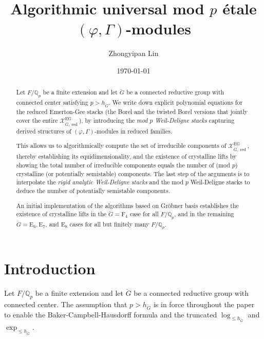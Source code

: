 \documentclass[11pt]{amsart}
\theoremstyle{definition}
\newcommand{\Q}{\mathbb{Q}}
\newcommand{\cX}{\mathcal{X}}
\newcommand{\bG}{\breve{G}}
\DeclareMathOperator{\EG}{EG}
\DeclareMathOperator{\red}{red}
\begin{document}
\title{Algorithmic universal mod $p$ \'etale $(\varphi, \Gamma)$-modules}

\author{Zhongyipan Lin}
\date{\today}





\begin{abstract}
Let $F/\Q_p$ be a finite extension and
let $\bG$ be a connected reductive group
with connected center
satisfying $p>h_{\bG}$.
We write down explicit polynomial equations
for the reduced Emerton-Gee stacks
(the Borel and the twisted Borel versions
that jointly cover the entire $\cX_{\bG,\red}^{\EG}$),
by introducing the
{\it mod $p$ Weil-Deligne stacks} capturing
derived structures of
$(\varphi, \Gamma)$-modules in reduced families.

This allows us to algorithmically
compute the set of irreducible components
of $\cX_{\bG,\red}^{\EG}$,
thereby establishing its equidimensionality,
and the existence of crystalline lifts
by showing the total number of irreducible components
equals the number of (mod $p$) crystalline (or
potentially semistable) components.
The last step of the arguments is to interpolate the
{\it rigid analytic Weil-Deligne stacks}
and the
mod $p$ Weil-Deligne stacks to deduce 
the number of potentially semistable components.

An initial implementation of the algorithms
based on Gr\"obner basis
establishes the existence of crystalline lifts
in the $\bG=\mathrm{F}_4$ case
for all $F/\Q_p$,
and
in the remaining  $\bG=\mathrm{E}_6, \mathrm{E}_7$,
and $\mathrm{E}_8$ cases
for all but finitely many $F/\Q_p$.
\end{abstract}

\maketitle

\tableofcontents

\section{Introduction}

Let $F/\Q_p$ be a finite extension and
let $\bG$ be a connected reductive group
with connected center.
The assumption that $p>h_{\bG}$ is in force
throughout the paper
to enable the Baker-Campbell-Hausdorff formula
and the truncated $\log_{\le h_{\bG}}$
and $\exp_{\le h_{\bG}}$.
\end{document}

